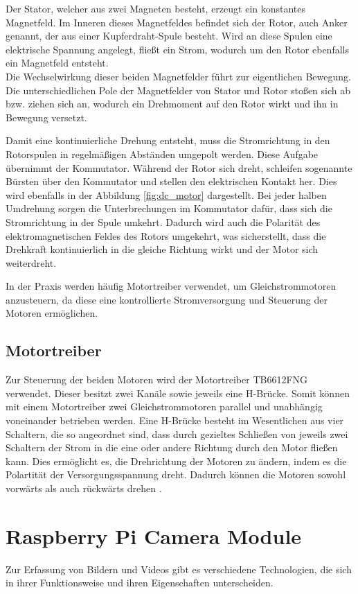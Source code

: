     Der Stator, welcher aus zwei Magneten besteht, erzeugt ein konstantes Magnetfeld. Im Inneren dieses Magnetfeldes befindet sich der Rotor, auch Anker genannt, der aus einer Kupferdraht-Spule besteht. Wird an diese Spulen eine elektrische Spannung angelegt, fließt ein Strom, wodurch um den Rotor ebenfalls ein Magnetfeld entsteht.\\
    Die Wechselwirkung dieser beiden Magnetfelder führt zur eigentlichen Bewegung. Die unterschiedlichen Pole der Magnetfelder von Stator und Rotor stoßen sich ab bzw. ziehen sich an, wodurch ein Drehmoment auf den Rotor wirkt und ihn in Bewegung versetzt.
    
    Damit eine kontinuierliche Drehung entsteht, muss die Stromrichtung in den Rotorspulen in regelmäßigen Abständen umgepolt werden. Diese Aufgabe übernimmt der Kommutator. Während der Rotor sich dreht, schleifen sogenannte Bürsten über den Kommutator und stellen den elektrischen Kontakt her. Dies wird ebenfalls in der Abbildung \ref{fig:dc_motor} dargestellt. Bei jeder halben Umdrehung sorgen die Unterbrechungen im Kommutator dafür, dass sich die Stromrichtung in der Spule umkehrt. Dadurch wird auch die Polarität des elektromagnetischen Feldes des Rotors umgekehrt, was sicherstellt, dass die Drehkraft kontinuierlich in die gleiche Richtung wirkt und der Motor sich weiterdreht.
    
    In der Praxis werden häufig Motortreiber verwendet, um Gleichstrommotoren anzusteuern, da diese eine kontrollierte Stromversorgung und Steuerung der Motoren ermöglichen.

    \subsection{Motortreiber}
    Zur Steuerung der beiden Motoren wird der Motortreiber \emph{}{TB6612FNG} verwendet. Dieser besitzt zwei Kanäle sowie jeweils eine H-Brücke. Somit können mit einem Motortreiber zwei Gleichstrommotoren parallel und unabhängig voneinander betrieben werden. Eine H-Brücke besteht im Wesentlichen aus vier Schaltern, die so angeordnet sind, dass durch gezieltes Schließen von jeweils zwei Schaltern der Strom in die eine oder andere Richtung durch den Motor fließen kann. Dies ermöglicht es, die Drehrichtung der Motoren zu ändern, indem es die Polartität der Versorgungsspannung dreht. Dadurch können die Motoren sowohl vorwärts als auch rückwärts drehen \cite[S. 295 ff.]{ElektronikFuerEinsteigera}.

\section{Raspberry Pi Camera Module}
Zur Erfassung von Bildern und Videos gibt es verschiedene Technologien, die sich in ihrer Funktionsweise und ihren Eigenschaften unterscheiden. 

